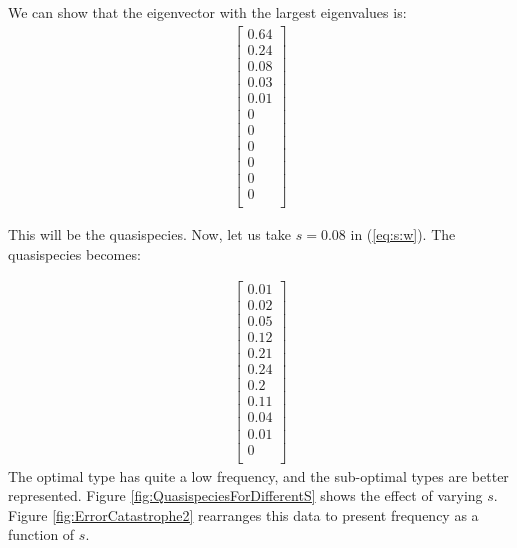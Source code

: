 \documentclass[]{article}
\begin{document}
We can show that the eigenvector with the largest eigenvalues is:
\begin{align*}
	\begin{bmatrix}
	0.64\\
	0.24\\
	0.08\\
	0.03\\
	0.01\\
	0\\
	0\\
	0\\
	0\\
	0\\
	0\\
	\end{bmatrix}
\end{align*}

This will be the quasispecies.
Now, let us take $s=0.08$ in (\ref{eq:s:w}). The quasispecies becomes:

\begin{align*}
	\begin{bmatrix}
		0.01\\
		0.02\\
		0.05\\
		0.12\\
		0.21\\
		0.24\\
		0.2\\
		0.11\\
		0.04\\
		0.01\\
		0\\
	\end{bmatrix}
\end{align*}
The optimal type has quite a low frequency, and the sub-optimal types are better represented. Figure \ref{fig:QuasispeciesForDifferentS} shows the effect of varying $s$. Figure \ref{fig:ErrorCatastrophe2} rearranges this data to present frequency as a function of $s$.
\end{document}

